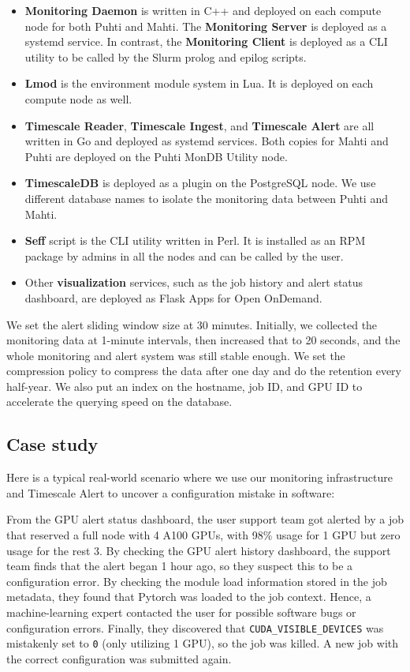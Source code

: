 \begin{itemize}
    \item \textbf{Monitoring Daemon} is written in C++ and deployed on each compute node for both Puhti and Mahti. The \textbf{Monitoring Server} is deployed as a systemd service. In contrast, the \textbf{Monitoring Client} is deployed as a CLI utility to be called by the Slurm prolog and epilog scripts.
    \item \textbf{Lmod} is the environment module system in Lua. It is deployed on each compute node as well.
    \item \textbf{Timescale Reader}, \textbf{Timescale Ingest}, and \textbf{Timescale Alert} are all written in Go and deployed as systemd services. Both copies for Mahti and Puhti are deployed on the Puhti MonDB Utility node.
    \item \textbf{TimescaleDB} is deployed as a plugin on the PostgreSQL node. We use different database names to isolate the monitoring data between Puhti and Mahti.
    \item \textbf{Seff} script is the CLI utility written in Perl. It is installed as an RPM package by admins in all the nodes and can be called by the user.
    \item Other \textbf{visualization} services, such as the job history and alert status dashboard, are deployed as Flask Apps for Open OnDemand.
\end{itemize}

We set the alert sliding window size at 30 minutes. Initially, we collected the monitoring data at 1-minute intervals, then increased that to 20 seconds, and the whole monitoring and alert system was still stable enough. We set the compression policy to compress the data after one day and do the retention every half-year. We also put an index on the hostname, job ID, and GPU ID to accelerate the querying speed on the database.

\subsection{Case study}
Here is a typical real-world scenario where we use our monitoring infrastructure and Timescale Alert to uncover a configuration mistake in software:

From the GPU alert status dashboard, the user support team got alerted by a job that reserved a full node with 4 A100 GPUs, with 98\% usage for 1 GPU but zero usage for the rest 3. By checking the GPU alert history dashboard, the support team finds that the alert began 1 hour ago, so they suspect this to be a configuration error. By checking the module load information stored in the job metadata, they found that Pytorch was loaded to the job context. Hence, a machine-learning expert contacted the user for possible software bugs or configuration errors. Finally, they discovered that \texttt{CUDA\_VISIBLE\_DEVICES} was mistakenly set to \texttt{0} (only utilizing 1 GPU), so the job was killed. A new job with the correct configuration was submitted again.

